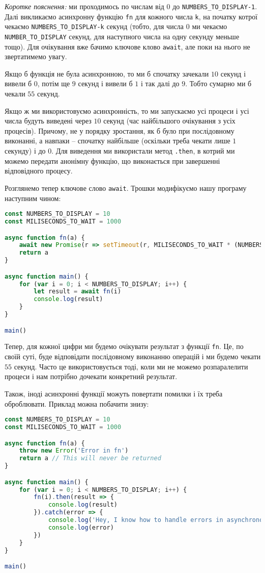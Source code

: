 \documentclass[12pt]{extarticle}
\begin{document}
\textit{Коротке пояснення:} ми проходимось по числам від $0$ до \texttt{NUMBERS\_TO\_DISPLAY-1}. Далі викликаємо асинхронну функцію \texttt{fn} для кожного числа \texttt{k}, на початку котрої чекаємо \texttt{NUMBERS\_TO\_DISPLAY-k} секунд (тобто, для числа $0$ ми чекаємо \texttt{NUMBER\_TO\_DISPLAY} секунд, для наступного числа на одну секунду меньше тощо). Для очікування вже бачимо ключове клово \texttt{await}, але поки на нього не звертатимемо увагу.

Якщо б функція не була асинхронною, то ми б спочатку зачекали $10$ секунд і вивели б $0$, потім ще $9$ секунд і вивели б $1$ і так далі до $9$. Тобто сумарно ми б чекали $55$ секунд.

Якщо ж ми використовуємо асинхронність, то ми запускаємо усі процеси і усі числа будуть виведені через $10$ секунд (час найбільшого очікування з усіх процесів). Причому, не у порядку зростання, як б було при послідовному виконанні, а навпаки -- спочатку найбільше (оскільки треба чекати лише $1$ секунду) і до $0$. Для виведення ми використали метод \texttt{.then}, в котрий ми можемо передати анонімну функцію, що виконається при завершенні відповідного процесу.

Розглянемо тепер ключове слово \texttt{await}. Трошки модифікуємо нашу програму наступним чином:
\begin{lstlisting}[language=javascript, caption=Використання ключового слову \texttt{await}]
const NUMBERS_TO_DISPLAY = 10
const MILISECONDS_TO_WAIT = 1000

async function fn(a) {
    await new Promise(r => setTimeout(r, MILISECONDS_TO_WAIT * (NUMBERS_TO_DISPLAY - a)))
    return a
}

async function main() {
    for (var i = 0; i < NUMBERS_TO_DISPLAY; i++) {
        let result = await fn(i)
        console.log(result)
    }
}

main()
\end{lstlisting}

Тепер, для кожної цифри ми будемо очікувати результат з функції \texttt{fn}. Це, по своїй суті, буде відповідати послідовному виконанню операцій і ми будемо чекати $55$ секунд. Часто це використовується тоді, коли ми не можемо розпаралелити процеси і нам потрібно дочекати конкретний результат. 

Також, іноді асинхронні функції можуть повертати помилки і їх треба оброблювати. Приклад можна побачити знизу:
\begin{lstlisting}[language=javascript, caption=Обробка помилок]
const NUMBERS_TO_DISPLAY = 10
const MILISECONDS_TO_WAIT = 1000

async function fn(a) {
    throw new Error('Error in fn')
    return a // This will never be returned
}

async function main() {
    for (var i = 0; i < NUMBERS_TO_DISPLAY; i++) {
        fn(i).then(result => {
            console.log(result)
        }).catch(error => {
            console.log('Hey, I know how to handle errors in asynchronous js!')
            console.log(error)
        })
    }
}

main()
\end{lstlisting}
\end{document}
